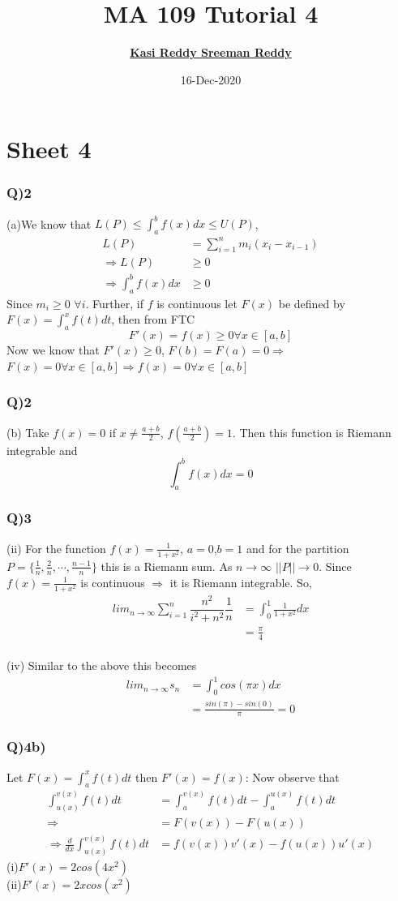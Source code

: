 \documentclass[11pt]{beamer}
\author[K. Sreeman Reddy]{\href{http://iamsreeman.github.io/}{\textbf{Kasi Reddy Sreeman Reddy}}\linebreak\text{2nd year physics student}\linebreak\text{\href{http://iamsreeman.github.io/MA109}{http://iamsreeman.github.io/MA109}}}
\title{MA 109 Tutorial 4}
\institute[]{IIT Bombay}
\date{16-Dec-2020}
\begin{document}
\begin{frame}
\titlepage
\end{frame}


\section{Sheet 4}
\begin{frame}
\frametitle{Q)2}
(a)We know that $L(P)\leq \int_{a}^{b}f(x)dx \leq U(P)$,
\begin{align*}
L(P)&=\sum_{i=1}^{n} m_i(x_i-x_{i-1})\\
\Rightarrow L(P)&\geq 0\\
\Rightarrow \int_{a}^{b}f(x)dx&\geq 0
\end{align*}
Since $m_i\geq 0$  $\forall i$. Further, if $f$ is continuous let $F(x)$ be defined by $F(x)=\int_{a}^{x}f(t)dt$, then from FTC
$$F'(x)=f(x)\geq 0\forall x\in [a,b]$$
Now we know that $F'(x)\geq 0$, $F(b)=F(a)=0\Rightarrow$ $F(x)=0\forall x\in[a,b]\Rightarrow f(x)=0\forall x\in[a,b]$
\end{frame}
\begin{frame}
\frametitle{Q)2}
(b) Take $f(x)=0$ if $x\neq \frac{a+b}{2}$, $f(\frac{a+b}{2})=1$. Then this function is Riemann integrable and
$$\int_{a}^{b}f(x)dx =0 $$
\end{frame}
\begin{frame}
\frametitle{Q)3}
(ii) For the function $f(x)=\frac{1}{1+x^2}$, $a=0$,$b=1$ and for the partition $P=\{\frac{1}{n},\frac{2}{n},\cdots,\frac{n-1}{n} \}$ this is a Riemann sum. As $n\to\infty$ $||P||\to 0$. Since $f(x)=\frac{1}{1+x^2}$ is continuous $\Rightarrow$ it is Riemann integrable. So,
\begin{align*}
lim_{n\to\infty} \sum_{i=1}^{n}\dfrac{n^2}{i^2+n^2}\dfrac{1}{n}&=\int_{0}^{1}\frac{1}{1+x^2}dx\\
&=\frac{\pi}{4}
\end{align*}
\\
(iv) Similar to the above this becomes
\begin{align*}
lim_{n\to\infty} s_n&=\int_{0}^{1}cos(\pi x)dx\\
&=\frac{sin(\pi)-sin(0)}{\pi}=0
\end{align*}
\end{frame}
\begin{frame}
\frametitle{Q)4b)}
Let $F(x) = \int_a^x f(t)dt$ then $F'(x) = f(x)$: Now observe that
\begin{align*}
\int_{u(x)}^{v(x)}f(t)dt&=\int_{a}^{v(x)}f(t)dt-\int_{a}^{u(x)}f(t)dt\\
\Rightarrow&=F(v(x))-F(u(x))\\
\Rightarrow\frac{d}{dx}\int_{u(x)}^{v(x)}f(t)dt&=f(v(x))v'(x)-f(u(x))u'(x)
\end{align*}
(i)$F'(x)=2cos(4x^2)$
\\
(ii)$F'(x)=2xcos(x^2)$
\end{frame}
\end{document}
